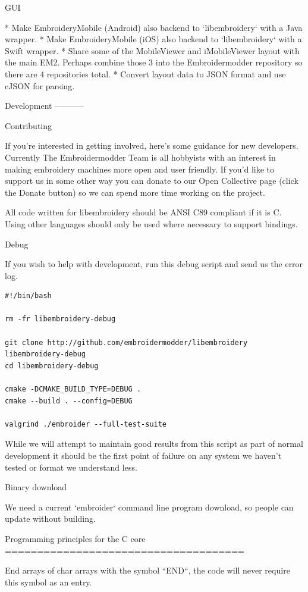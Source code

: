 \documentclass[a4paper]{report}
\begin{document}
GUI
~~~

* Make EmbroideryMobile (Android) also backend to `libembroidery` with a Java wrapper.
* Make EmbroideryMobile (iOS) also backend to `libembroidery` with a Swift wrapper.
* Share some of the MobileViewer and iMobileViewer layout with the main EM2. Perhaps combine those 3 into the Embroidermodder repository so there are 4 repositories total.
* Convert layout data to JSON format and use cJSON for parsing.

Development
-----------

Contributing
~~~~~~~~~~~~

If you're interested in getting involved, here's some guidance
for new developers. Currently The Embroidermodder Team is all
hobbyists with an interest in making embroidery machines more
open and user friendly. If you'd like to support us in some other way
you can donate to our Open Collective page (click the Donate button) so
we can spend more time working on the project.

All code written for libembroidery should be ANSI C89 compliant
if it is C. Using other languages should only be used where
necessary to support bindings.

Debug
~~~~~

If you wish to help with development, run this debug script and send us the
error log.

\begin{lstlisting}
#!/bin/bash

rm -fr libembroidery-debug

git clone http://github.com/embroidermodder/libembroidery libembroidery-debug
cd libembroidery-debug

cmake -DCMAKE_BUILD_TYPE=DEBUG .
cmake --build . --config=DEBUG

valgrind ./embroider --full-test-suite
\end{lstlisting}

While we will attempt to maintain good results from this script as part of
normal development it should be the first point of failure on any system we
haven't tested or format we understand less.

Binary download
~~~~~~~~~~~~~~~

We need a current `embroider` command line program download, so people can update
without building.

Programming principles for the C core
=====================================

End arrays of char arrays with the symbol ``END``, the code will never require
this symbol as an entry.
\end{document}
